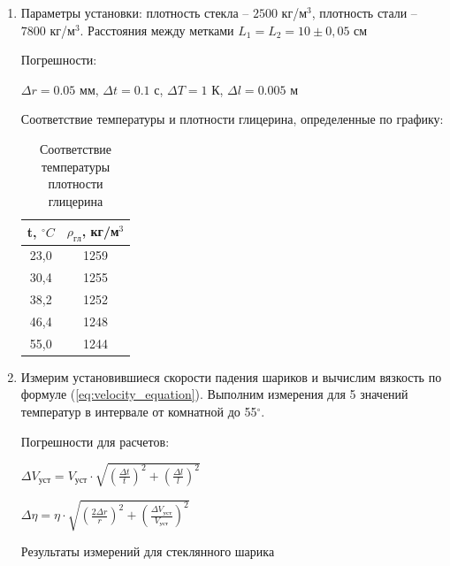 \documentclass[12pt,a4paper]{article}
\begin{document}
\begin{enumerate}

\item Параметры установки: плотность стекла -- $2500$ кг/м$^3$, плотность стали -- $7800$ кг/м$^3$. Расстояния между метками $L_1 = L_2 = 10 \pm 0,05$ см

Погрешности:

$\Delta r = 0.05 $ мм, $\Delta t = 0.1$ с, $\Delta T = 1 $ К, $\Delta l = 0.005$ м

Соответствие температуры и плотности глицерина, определенные по графику:

\begin{table}[h!]
\centering
	\caption{Соответствие температуры плотности глицерина}

\begin{tabular}{|c|c|}
\hline
\multicolumn{1}{|l|}{t, $^\circ C$} & \multicolumn{1}{l|}{$\rho_{гл}$, кг/м$^3$} \\ \hline
23,0                         & 1259                             \\ \hline
30,4                       & 1255                             \\ \hline
38,2                       & 1252                             \\ \hline
46,4                       & 1248                             \\ \hline
55,0                         & 1244                             \\ \hline
\end{tabular}
\end{table}

\item Измерим установившиеся скорости падения шариков и вычислим вязкость по формуле (\ref{eq:velocity_equation}). Выполним измерения для 5 значений температур в интервале от комнатной до 55$^{\circ}$.

Погрешности для расчетов:

$\Delta V_{уст} = V_{уст} \cdot \sqrt{ \left(\frac{\Delta t}{t}\right)^2 + \left(\frac{\Delta l}{l}\right)^2  }$

$\Delta \eta = \eta \cdot \sqrt{ \left(\frac{2 \Delta r}{r}\right)^2 + \left(\frac{\Delta V_{уст} }{V_{уст} }\right)^2  }$

\begin{table}[h!]
\centering
	\caption{Результаты измерений для стеклянного шарика}


\end{table}
\end{enumerate}
\end{document}
